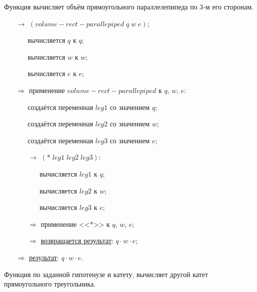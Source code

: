 \problem Функция вычисляет объём прямоугольного параллелепипеда по 3-м его сторонам.


\begin{itemize}
	\item[$\longrightarrow$] $(volume\!-\!rect\!-\!parallepiped\; q\; w\; e)$;
	\begin{itemize}
		\item[\textbullet] вычисляется $q$ к $q$;
		\item[\textbullet] вычисляется $w$ к $w$;
		\item[\textbullet] вычисляется $e$ к $e$;
	\end{itemize}
	\item[$\Longrightarrow$] применение $volume\!-\!rect\!-\!parallepiped$ к $q$, $w$, $e$:
	\begin{itemize}
		\item[\textbullet] создаётся переменная $leg1$ со значением $q$;
		\item[\textbullet] создаётся переменная $leg2$ со значением $w$;
		\item[\textbullet] создаётся переменная $leg3$ со значением $e$;
		\item[$\longrightarrow$] $(*\; leg1\; leg2\; leg3)$:
		\begin{itemize}
			\item[\textbullet] вычисляется $leg1$ к $q$;
			\item[\textbullet] вычисляется $leg2$ к $w$;
			\item[\textbullet] вычисляется $leg3$ к $e$;
		\end{itemize}
		\item[$\Longrightarrow$] применение <<$*$>> к $q$, $w$, $e$;
		\item[$\Longrightarrow$] \underline{возвращается результат}: $q \cdot w \cdot e$;
	\end{itemize}
	\item[$\Longrightarrow$] \underline{результат}: $q \cdot w \cdot e$.
\end{itemize}


\newpage
\problem Функция по заданной гипотенузе и катету, вычисляет другой катет прямоугольного треугольника.


